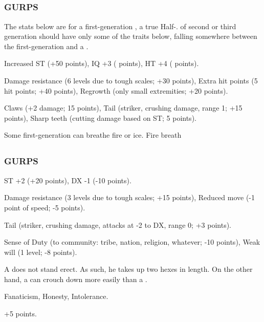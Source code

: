 \subsection{\Rachyth}
\subsubsection{GURPS}
The stats below are for a first-generation \rachyth, a true Half-\Dragon. \Rachyth{} of second or third generation should have only some of the traits below, falling somewhere between the first-generation \rachyth{} and a \scatha. 
\bd
  \item[Attributes:] Increased ST (+50 points), IQ +3 ( points), HT +4 ( points). 
  \item[Physical traits:] Damage resistance (6 levels due to tough scales; +30 points), Extra hit points (5 hit points; +40 points), Regrowth (only small extremities; +20 points). 
  
  Claws (+2 damage; 15 points), Tail (striker, crushing damage, range 1; +15 points), Sharp teeth (cutting damage based on ST; 5 points). 
  
  Some first-generation \rachyth{} can breathe fire or ice. Fire breath 
  \item[Mental traits:] 
  \item[Common traits:] 
  \item[Net cost:] 
\ed



\subsection{\Scatha}
\subsubsection{GURPS}
\bd
  \item[Attributes:] ST +2 (+20 points), DX -1 (-10 points). 
  \item[Physical traits:] Damage resistance (3 levels due to tough scales; +15 points), Reduced move (-1 point of speed; -5 points). 
  
  Tail (striker, crushing damage, attacks at -2 to DX, range 0; +3 points). 
  \item[Mental traits:] Sense of Duty (to community: tribe, nation, religion, whatever; -10 points), Weak will (1 level; -8 points). 
  \item[Features:] A \scatha{} does not stand erect. As such, he takes up two hexes in length. On the other hand, a \scatha{} can crouch down more easily than a \human. 
  \item[Common traits:] Fanaticism, Honesty, Intolerance. 
  \item[Net cost:] +5 points. 
\ed
